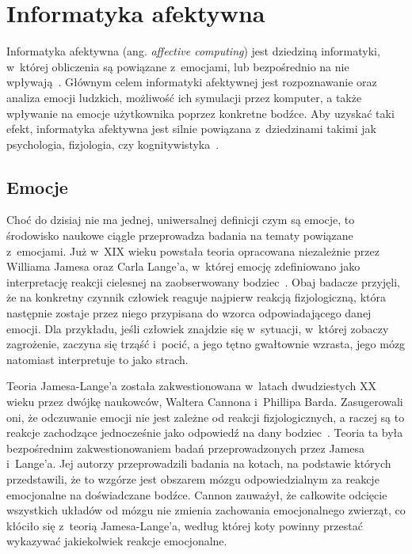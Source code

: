 \chapter{Informatyka afektywna}
\label{cha:affectiveComputing}

Informatyka afektywna (ang. \textit{affective computing}) jest dziedziną informatyki, w~której obliczenia są powiązane z~emocjami, lub bezpośrednio na nie wpływają~\cite{Picard:1997:AC:265013}. Głównym celem informatyki afektywnej jest rozpoznawanie oraz analiza emocji ludzkich, możliwość ich symulacji przez komputer, a także wpływanie na emocje użytkownika poprzez konkretne bodźce. Aby uzyskać taki efekt, informatyka afektywna jest silnie powiązana z~dziedzinami takimi jak psychologia, fizjologia, czy kognitywistyka~\cite{affective_computing_review_tao_tieniu}.

\section{Emocje}
Choć do dzisiaj nie ma jednej, uniwersalnej definicji czym są emocje, to środowisko naukowe ciągle przeprowadza badania na tematy powiązane z~emocjami. Już w~XIX wieku powstała teoria opracowana niezależnie przez Williama Jamesa oraz Carla Lange'a, w~której emocję zdefiniowano jako interpretację reakcji cielesnej na zaobserwowany bodziec~\cite{Coleman2011}. Obaj badacze przyjęli, że na konkretny czynnik człowiek reaguje najpierw reakcją fizjologiczną, która następnie zostaje przez niego przypisana do wzorca odpowiadającego danej emocji. Dla przykładu, jeśli człowiek znajdzie się w~sytuacji, w~której zobaczy zagrożenie, zaczyna się trząść i~pocić, a jego tętno gwałtownie wzrasta, jego mózg natomiast interpretuje to jako strach.

Teoria Jamesa-Lange'a została zakwestionowana w~latach dwudziestych XX wieku przez dwójkę naukowców, Waltera Cannona i~Phillipa Barda. Zasugerowali oni, że odczuwanie emocji nie jest zależne od reakcji fizjologicznych, a raczej są to reakcje zachodzące jednocześnie jako odpowiedź na dany bodziec~\cite{cannon_1927}. Teoria ta była bezpośrednim zakwestionowaniem badań przeprowadzonych przez Jamesa i~Lange'a. Jej autorzy przeprowadzili badania na kotach, na podstawie których przedstawili, że to wzgórze jest obszarem mózgu odpowiedzialnym za reakcje emocjonalne na doświadczane bodźce. Cannon zauważył, że całkowite odcięcie wszystkich układów od mózgu nie zmienia zachowania emocjonalnego zwierząt, co kłóciło się z~teorią Jamesa-Lange'a, według której koty powinny przestać wykazywać jakiekolwiek reakcje emocjonalne.


